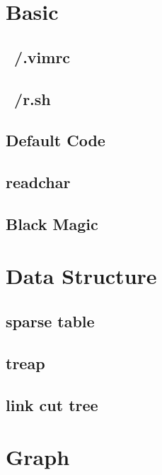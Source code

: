 
\section{Basic}
\subsection{~/.vimrc}

\subsection{~/r.sh}

% 
\subsection{Default Code}

\subsection{readchar}

\subsection{Black Magic}


\section{Data Structure}
\subsection{sparse table}

\subsection{treap}

\subsection{link cut tree}


\section{Graph}
